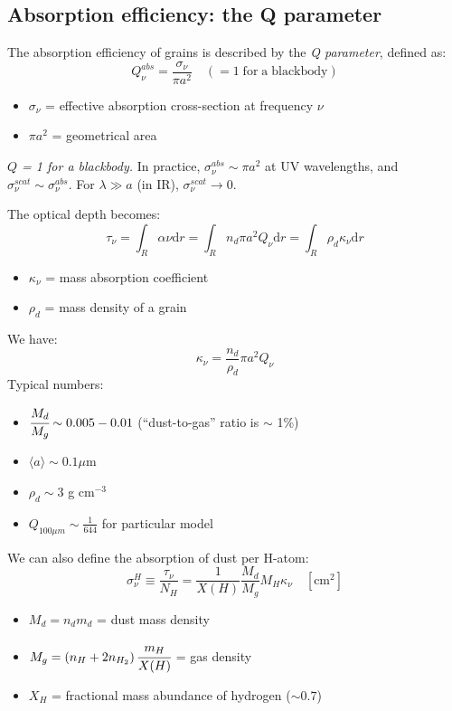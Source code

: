 \documentclass[12pt]{article}
\newcommand{\mar}[1]{\hspace{0pt}\marginpar{-\textcolor{black}{#1}-}}
\newcommand{\mynotes}[1]{{\fontfamily{cmss}\selectfont \textit{#1}}}
\begin{document}
\subsection{Absorption efficiency: the Q parameter}
The absorption efficiency of grains is described by the \textit{Q parameter},
defined as:
\[
    Q_{\nu}^{abs}
    = \frac{\sigma_{\nu}}{{\pi}a^{2}}
    \quad
    (= 1 \;\mathrm{for\;a\;blackbody})
    \]
\begin{itemize}[label={}]
    \item $\sigma_{\nu}$ = effective absorption cross-section at frequency
        $\nu$
    \item ${\pi}a^{2}$ = geometrical area
\end{itemize}
\mynotes{$Q$ = 1 for a blackbody.}
In practice, $\sigma_{\nu}^{abs} \sim {\pi}a^{2} $
at UV wavelengths, and $\sigma_{\nu}^{scat} \sim \sigma_{\nu}^{abs}$.
For $\lambda \gg a$ (in IR), $\sigma_{\nu}^{scat} \rightarrow 0$.

\mar{106}The optical depth becomes:
\[
    \tau_{\nu}
    = \int_{R}{ \alpha{\nu} \mathrm{d}r}
    = \int_{R}{ n_{d} \pi a^{2} Q_{\nu} \mathrm{d}r}
    = \int_{R}{ \rho_{d}\kappa_{\nu} \mathrm{d}r}
    \]
\begin{itemize}
    \item $\kappa_{\nu}$ = mass absorption coefficient
    \item $\rho_{d}$ = mass density of a grain
\end{itemize}
We have:
\[
    \kappa_{\nu} = \frac{n_{d}}{\rho_{d}} \pi a^{2} Q_{\nu}
    \]
Typical numbers:
\begin{itemize}[label={}, itemsep=1ex]
    \item $\cfrac{M_{d}}{M_{g}} \sim 0.005 - 0.01$
        (``dust-to-gas'' ratio is $\sim$ 1\%)
    \item $\langle a \rangle \sim 0.1 \mu$m
    \item $\rho_{d} \sim 3$ g cm$^{-3}$
    \item $Q_{100{\mu}m} \sim \frac{1}{644}$ for particular model
\end{itemize}
We can also define the absorption of dust per H-atom:
\[
    \sigma_{\nu}^{H}
    \equiv \frac{\tau_{\nu}}{N_{H}}
    = \frac{1}{X(H)} \frac{M_{d}}{M_{g}} M_{H} \kappa_{\nu} \quad
    [\mathrm{cm}^{2}]
    \]
\begin{itemize}[label={}, itemsep=1ex]
    \item $M_{d} = n_{d}m_{d}$ = dust mass density
    \item $M_{g} = \left( n_{H} + 2n_{H_{2}} \right)
        \cfrac{m_{H}}{X(H)}$ = gas density
    \item $X_{H}$ = fractional mass abundance of hydrogen ($ \sim 0.7 $)
\end{itemize}
\end{document}
